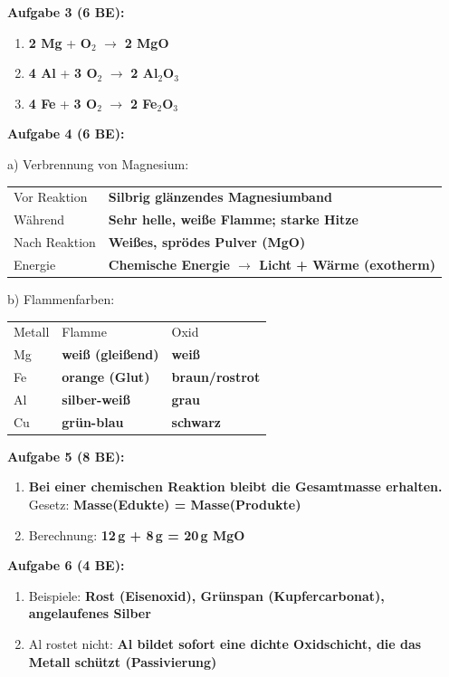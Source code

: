 \documentclass[11pt, a4paper]{article}
\newcommand{\lsg}[1]{\textcolor{loesung}{\textbf{#1}}}
\begin{document}
\textbf{Aufgabe 3 (6 BE):}
\begin{enumerate}[label=\alph*), leftmargin=1.5em, itemsep=0pt]
    \item \lsg{2 Mg} + \lsg{O$_2$} $\rightarrow$ \lsg{2 MgO}
    \item \lsg{4 Al} + \lsg{3 O$_2$} $\rightarrow$ \lsg{2 Al$_2$O$_3$}
    \item \lsg{4 Fe} + \lsg{3 O$_2$} $\rightarrow$ \lsg{2 Fe$_2$O$_3$}
\end{enumerate}

\textbf{Aufgabe 4 (6 BE):}

a) Verbrennung von Magnesium:
\begin{tabular}{ll}
Vor Reaktion & \lsg{Silbrig glänzendes Magnesiumband} \\
Während & \lsg{Sehr helle, weiße Flamme; starke Hitze} \\
Nach Reaktion & \lsg{Weißes, sprödes Pulver (MgO)} \\
Energie & \lsg{Chemische Energie $\rightarrow$ Licht + Wärme (exotherm)}
\end{tabular}

b) Flammenfarben:
\begin{tabular}{lll}
Metall & Flamme & Oxid \\
Mg & \lsg{weiß (gleißend)} & \lsg{weiß} \\
Fe & \lsg{orange (Glut)} & \lsg{braun/rostrot} \\
Al & \lsg{silber-weiß} & \lsg{grau} \\
Cu & \lsg{grün-blau} & \lsg{schwarz}
\end{tabular}

\textbf{Aufgabe 5 (8 BE):}
\begin{enumerate}[label=\alph*), leftmargin=1.5em, itemsep=0pt]
    \item \lsg{Bei einer chemischen Reaktion bleibt die Gesamtmasse erhalten.}\\
    Gesetz: \lsg{Masse(Edukte) = Masse(Produkte)}
    \item Berechnung: \lsg{12\,g + 8\,g = \textbf{20\,g MgO}}
\end{enumerate}

\textbf{Aufgabe 6 (4 BE):}
\begin{enumerate}[label=\alph*), leftmargin=1.5em, itemsep=0pt]
    \item Beispiele: \lsg{Rost (Eisenoxid), Grünspan (Kupfercarbonat), angelaufenes Silber}
    \item Al rostet nicht: \lsg{Al bildet sofort eine dichte Oxidschicht, die das Metall schützt (Passivierung)}
\end{enumerate}
\end{document}

